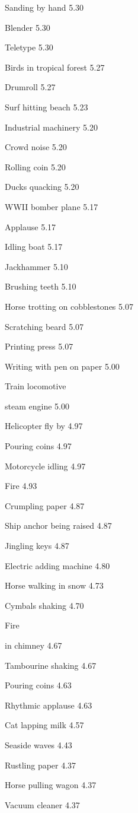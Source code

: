 \documentclass{sig-alternate-05-2015}
\begin{document}
{ Sanding by hand
5.30 

 Blender
5.30 

 Teletype
5.30 

 Birds in tropical forest
5.27 

 Drumroll
5.27 

 Surf hitting beach
5.23 

 Industrial machinery
5.20 

 Crowd noise
5.20 

 Rolling coin
5.20 

 Ducks quacking
5.20 

 WWII bomber plane
5.17 

 Applause
5.17 

 Idling boat
5.17 

 Jackhammer
5.10 

 Brushing teeth
5.10 

 Horse trotting on cobblestones
5.07 

 Scratching beard
5.07 

 Printing press
5.07 

 Writing with pen on paper
5.00 

 Train locomotive 

 steam engine
5.00 

 Helicopter fly by
4.97 

 Pouring coins
4.97 

 Motorcycle idling
4.97 

 Fire
4.93 

 Crumpling paper
4.87 

 Ship anchor being raised
4.87 

 Jingling keys
4.87 

 Electric adding machine
4.80 

 Horse walking in snow
4.73 

 Cymbals shaking
4.70 

 Fire 

 in chimney
4.67 

 Tambourine shaking
4.67 

 Pouring coins
4.63 

 Rhythmic applause
4.63 

 Cat lapping milk
4.57 

 Seaside waves
4.43 

 Rustling paper
4.37 

 Horse pulling wagon
4.37 

 Vacuum cleaner
4.37 

}
\end{document}
